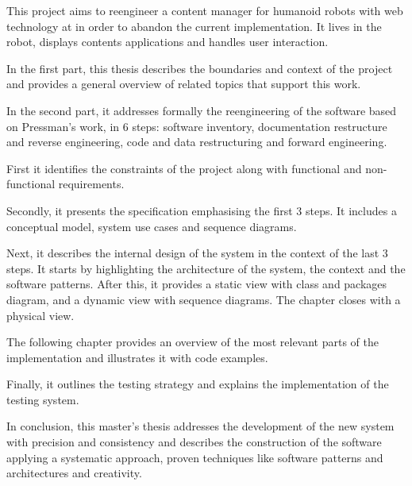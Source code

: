 % 
% 
%

This project aims to reengineer a content manager for humanoid robots with web technology at \company in order to abandon the current \flash implementation.
It lives in the robot, displays contents applications and handles user interaction.

In the first part, this thesis describes the boundaries and context of the project and provides a general overview of related topics that support this work.

In the second part, it addresses formally the reengineering of the software based on Pressman's work, in 6 steps: software inventory, documentation restructure and reverse engineering, code and data restructuring and forward engineering.

First it identifies the constraints of the project along with functional and non-functional requirements.

Secondly, it presents the specification emphasising the first 3 steps.
It includes a conceptual model, system use cases and sequence diagrams.

Next, it describes the internal design of the system in the context of the last 3 steps.
It starts by highlighting the architecture of the system, the context and the software patterns.
After this, it provides a static view with class and packages diagram, and a dynamic view with sequence diagrams.
The chapter closes with a physical view.

The following chapter provides an overview of the most relevant parts of the implementation and illustrates it with code examples.

Finally, it outlines the testing strategy and explains the implementation of the testing system.

In conclusion, this master's thesis addresses the development of the new system with precision and consistency and describes the construction of the software applying a systematic approach, proven techniques like software patterns and architectures and creativity.


